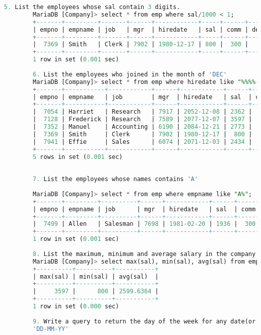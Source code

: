 \documentclass{article}
\begin{document}
\begin{lstlisting}[language=SQL]
		5. List the employees whose sal contain 3 digits. 
		MariaDB [Company]> select * from emp where sal/1000 < 1; 
		+-------+---------+-------+------+------------+-----+------+--------+ 
		| empno | empname | job   | mgr  | hiredate   | sal | comm | deptno | 
		+-------+---------+-------+------+------------+-----+------+--------+ 
		|  7369 | Smith   | Clerk | 7902 | 1980-12-17 | 800 |  300 |     20 | 
		+-------+---------+-------+------+------------+-----+------+--------+ 
		1 row in set (0.001 sec) 
		
		6. List the employees who joined in the month of 'DEC' 
		MariaDB [Company]> select * from emp where hiredate like "%%%%-12-%%"; 
		+-------+-----------+------------+------+------------+------+------+--------+ 
		| empno | empname   | job        | mgr  | hiredate   | sal  | comm | deptno | 
		+-------+-----------+------------+------+------------+------+------+--------+ 
		|  7054 | Harriet   | Research   | 7917 | 2052-12-08 | 2362 |  229 |     20 | 
		|  7128 | Frederick | Research   | 7589 | 2077-12-07 | 3597 |  203 |     20 | 
		|  7352 | Manuel    | Accounting | 6190 | 2084-12-21 | 2773 |  253 |     10 | 
		|  7369 | Smith     | Clerk      | 7902 | 1980-12-17 |  800 |  300 |     20 | 
		|  7941 | Effie     | Sales      | 6074 | 2071-12-03 | 2434 |  265 |     30 | 
		+-------+-----------+------------+------+------------+------+------+--------+ 
		5 rows in set (0.001 sec) 
		
		
		7. List the employees whose names contains 'A' 
		
		MariaDB [Company]> select * from emp where empname like "A%"; 
		+-------+---------+----------+------+------------+------+------+--------+ 
		| empno | empname | job      | mgr  | hiredate   | sal  | comm | deptno | 
		+-------+---------+----------+------+------------+------+------+--------+ 
		|  7499 | Allen   | Salesman | 7698 | 1981-02-20 | 1936 |  300 |     30 | 
		+-------+---------+----------+------+------------+------+------+--------+ 
		1 row in set (0.001 sec) 
		
		8. List the maximum, minimum and average salary in the company. 
		MariaDB [Company]> select max(sal), min(sal), avg(sal) from emp; 
		+----------+----------+-----------+ 
		| max(sal) | min(sal) | avg(sal)  | 
		+----------+----------+-----------+ 
		|     3597 |      800 | 2599.6364 | 
		+----------+----------+-----------+ 
		1 row in set (0.000 sec) 
		
		9. Write a query to return the day of the week for any date(or HIRE_DATE) entered in format 
		'DD-MM-YY' 
		

\end{lstlisting}
\end{document}
